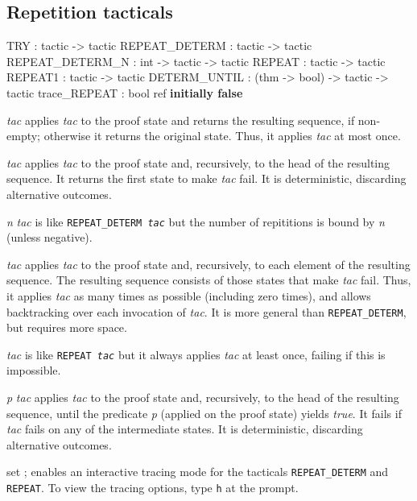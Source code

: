 \subsection{Repetition tacticals}
\begin{ttbox} 
TRY             : tactic -> tactic
REPEAT_DETERM   : tactic -> tactic
REPEAT_DETERM_N : int -> tactic -> tactic
REPEAT          : tactic -> tactic
REPEAT1         : tactic -> tactic
DETERM_UNTIL    : (thm -> bool) -> tactic -> tactic
trace_REPEAT    : bool ref \hfill{\bf initially false}
\end{ttbox}
\begin{ttdescription}
\item[\ttindexbold{TRY} {\it tac}] 
applies {\it tac\/} to the proof state and returns the resulting sequence,
if non-empty; otherwise it returns the original state.  Thus, it applies
{\it tac\/} at most once.

\item[\ttindexbold{REPEAT_DETERM} {\it tac}] 
applies {\it tac\/} to the proof state and, recursively, to the head of the
resulting sequence.  It returns the first state to make {\it tac\/} fail.
It is deterministic, discarding alternative outcomes.

\item[\ttindexbold{REPEAT_DETERM_N} {\it n} {\it tac}] 
is like \hbox{\tt REPEAT_DETERM {\it tac}} but the number of repititions
is bound by {\it n} (unless negative).

\item[\ttindexbold{REPEAT} {\it tac}] 
applies {\it tac\/} to the proof state and, recursively, to each element of
the resulting sequence.  The resulting sequence consists of those states
that make {\it tac\/} fail.  Thus, it applies {\it tac\/} as many times as
possible (including zero times), and allows backtracking over each
invocation of {\it tac}.  It is more general than {\tt REPEAT_DETERM}, but
requires more space.

\item[\ttindexbold{REPEAT1} {\it tac}] 
is like \hbox{\tt REPEAT {\it tac}} but it always applies {\it tac\/} at
least once, failing if this is impossible.

\item[\ttindexbold{DETERM_UNTIL} {\it p} {\it tac}] 
applies {\it tac\/} to the proof state and, recursively, to the head of the
resulting sequence, until the predicate {\it p} (applied on the proof state)
yields {\it true}. It fails if {\it tac\/} fails on any of the intermediate 
states. It is deterministic, discarding alternative outcomes.

\item[set \ttindexbold{trace_REPEAT};] 
enables an interactive tracing mode for the tacticals {\tt REPEAT_DETERM}
and {\tt REPEAT}.  To view the tracing options, type {\tt h} at the prompt.
\end{ttdescription}


